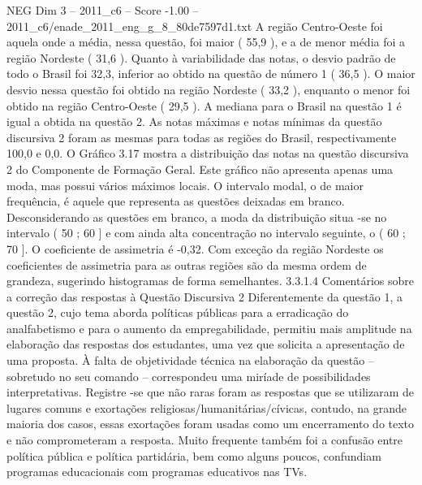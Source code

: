 \begin{textsample}{NEG Dim 3 – 2011\_c6 – Score -1.00 – 2011\_c6/enade\_2011\_eng\_g\_8\_80de7597d1.txt}
A região Centro-Oeste foi aquela onde a média, nessa questão, foi maior ( 55,9 ), e a de menor média foi a região Nordeste ( 31,6 ).
Quanto à variabilidade das notas, o desvio padrão de todo o Brasil foi 32,3, inferior ao obtido na questão de número 1 ( 36,5 ).
O maior desvio nessa questão foi obtido na região Nordeste ( 33,2 ), enquanto o menor foi obtido na região Centro-Oeste ( 29,5 ).
A mediana para o Brasil na questão 1 é igual a obtida na questão 2.
As notas máximas e notas mínimas da questão discursiva 2 foram as mesmas para todas as regiões do Brasil, respectivamente 100,0 e 0,0.
O Gráfico 3.17 mostra a distribuição das notas na questão discursiva 2 do Componente de Formação Geral.
Este gráfico não apresenta apenas uma moda, mas possui vários máximos locais.
O intervalo modal, o de maior frequência, é aquele que representa as questões deixadas em branco.
Desconsiderando as questões em branco, a moda da distribuição situa -se no intervalo ( 50 ; 60 ] e com ainda alta concentração no intervalo seguinte, o ( 60 ; 70 ].
O coeficiente de assimetria é -0,32.
Com exceção da região Nordeste os coeficientes de assimetria para as outras regiões são da mesma ordem de grandeza, sugerindo histogramas de forma semelhantes. 3.3.1.4 Comentários sobre a correção das respostas à Questão Discursiva 2 Diferentemente da questão 1, a questão 2, cujo tema aborda políticas públicas para a erradicação do analfabetismo e para o aumento da empregabilidade, permitiu mais amplitude na elaboração das respostas dos estudantes, uma vez que solicita a apresentação de uma proposta.
À falta de objetividade técnica na elaboração da questão – sobretudo no seu comando – correspondeu uma miríade de possibilidades interpretativas.
Registre -se que não raras foram as respostas que se utilizaram de lugares comuns e exortações religiosas/humanitárias/cívicas, contudo, na grande maioria dos casos, essas exortações foram usadas como um encerramento do texto e não comprometeram a resposta.
Muito frequente também foi a confusão entre política pública e política partidária, bem como alguns poucos, confundiam programas educacionais com programas educativos nas TVs.

\end{textsample}
